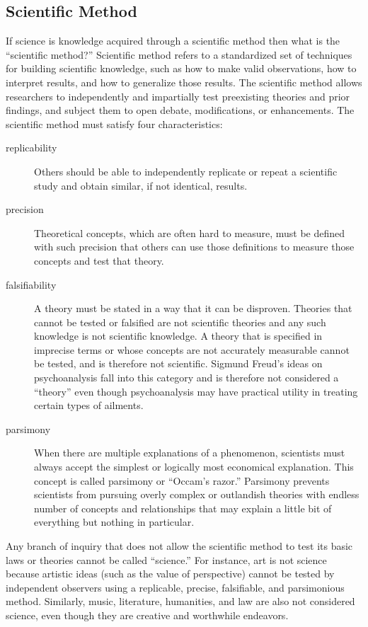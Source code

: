 \subsection{Scientific Method}

If science is knowledge acquired through a scientific method then what is the ``scientific method?'' Scientific method refers to a standardized set of techniques for building scientific knowledge, such as how to make valid observations, how to interpret results, and how to generalize those results. The scientific method allows researchers to independently and impartially test preexisting theories and prior findings, and subject them to open debate, modifications, or enhancements. The scientific method must satisfy four characteristics:

\begin{description}
	\item[\Gls{replicability}] Others should be able to independently replicate or repeat a scientific study and obtain similar, if not identical, results.

	\item[\Gls{precision}] Theoretical concepts, which are often hard to measure, must be defined with such precision that others can use those definitions to measure those concepts and test that theory.

	\item[\Gls{falsifiability}] A theory must be stated in a way that it can be disproven. Theories that cannot be tested or falsified are not scientific theories and any such knowledge is not scientific knowledge. A theory that is specified in imprecise terms or whose concepts are not accurately measurable cannot be tested, and is therefore not scientific. Sigmund Freud's ideas on psychoanalysis fall into this category and is therefore not considered a ``theory'' even though psychoanalysis may have practical utility in treating certain types of ailments.

	\item[\Gls{parsimony}] When there are multiple explanations of a phenomenon, scientists must always accept the simplest or logically most economical explanation. This concept is called parsimony or ``Occam's razor.'' Parsimony prevents scientists from pursuing overly complex or outlandish theories with endless number of concepts and relationships that may explain a little bit of everything but nothing in particular.
\end{description}

Any branch of inquiry that does not allow the scientific method to test its basic laws or theories cannot be called ``science.'' For instance, art is not science because artistic ideas (such as the value of perspective) cannot be tested by independent observers using a replicable, precise, falsifiable, and parsimonious method. Similarly, music, literature, humanities, and law are also not considered science, even though they are creative and worthwhile endeavors.

